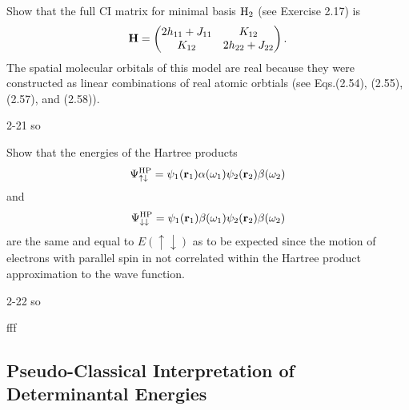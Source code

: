 \documentclass[a4paper]{book}
\newcommand{\bfr}{{\bf r}}
\begin{document}
	\begin{exercise}
	Show that the full CI matrix for minimal basis $\ce{H2}$ (see Exercise 2.17) is
	\[
		{\bf H} = \begin{pmatrix}
			2h_{11} + J_{11} & K_{12} \\
			K_{12} & 2h_{22} + J_{22}
		\end{pmatrix}.
	\]
	The spatial molecular orbitals of this model are real because they were constructed as linear combinations of real atomic orbtials (see Eqs.(2.54), (2.55), (2.57), and (2.58)).
	\end{exercise}
	
	\begin{solution}
		2-21 so
	\end{solution}
	
	\begin{exercise}
	Show that the energies of the Hartree products
	\[
		\Psi^{\rm HP}_{\uparrow\downarrow} = \psi_1(\bfr_1) \alpha(\omega_1) \psi_2(\bfr_2) \beta(\omega_2)
	\]
	and
		\[
		\Psi^{\rm HP}_{\downarrow\downarrow} = \psi_1(\bfr_1) \beta(\omega_1) \psi_2(\bfr_2) \beta(\omega_2)
	\]
	are the same and equal to $E(\uparrow\downarrow)$ as to be expected since the motion of electrons with parallel spin in not correlated within the Hartree product approximation to the wave function.
	\end{exercise}
	
	\begin{solution}
		2-22 so
		
		fff
	\end{solution}
	
	\subsection{Pseudo-Classical Interpretation of Determinantal Energies}
	
\end{document}

